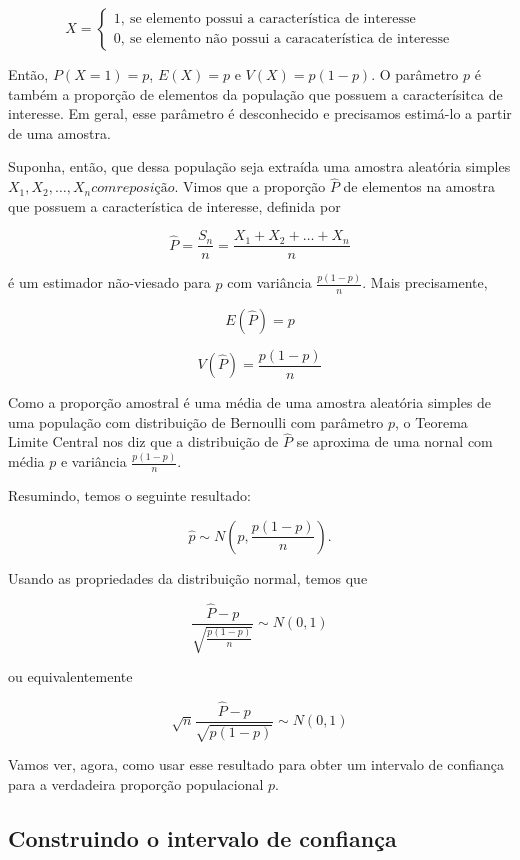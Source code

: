 \documentclass[
]{book}
\begin{document}
\[
X=\begin{cases}
1,~\text{se elemento possui a característica de interesse}\\
0,~\text{se elemento não possui a caracaterística de interesse}
\end{cases}
\]

Então, \(P(X = 1) = p\), \(E(X) = p\) e \(V(X) = p(1 - p)\). O parâmetro \(p\) é também a proporção de elementos da população que possuem a caracterísitca de interesse. Em geral, esse parâmetro é desconhecido e precisamos estimá-lo a partir de uma amostra.

Suponha, então, que dessa população seja extraída uma amostra aleatória simples \(X_1, X_2, \ldots, X_n com reposição\). Vimos que a proporção \(\hat P\) de elementos na amostra que possuem a característica de interesse, definida por

\[\hat P = \frac{S_n}{n}=\frac{X_1+X_2+\ldots+X_n}{n}\]

é um estimador não-viesado para \(p\) com variância \(\frac{p(1-p)}{n}\). Mais precisamente,

\[E(\hat P)=p\]

\[V(\hat P)=\frac{p(1-p)}{n}\]

Como a proporção amostral é uma média de uma amostra aleatória simples de uma população com distribuição de Bernoulli com parâmetro \(p\), o Teorema Limite Central nos diz que a distribuição de \(\hat P\) se aproxima de uma nornal com média \(p\) e variância \(\frac{p(1-p)}{n}\).

Resumindo, temos o seguinte resultado:

\[\hat p \sim N\left(p,\frac{p(1-p)}{n}\right).\]

Usando as propriedades da distribuição normal, temos que

\[\frac{\hat P - p}{\sqrt{\frac{p(1-p)}{n}}}\sim N(0,1)\]

ou equivalentemente

\[\sqrt{n}\frac{\hat P - p}{\sqrt{p(1-p)}}\sim N(0,1)\]

Vamos ver, agora, como usar esse resultado para obter um intervalo de confiança para a verdadeira proporção populacional \(p\).

\hypertarget{construindo-o-intervalo-de-confianuxe7a-2}{%
\subsection{Construindo o intervalo de confiança}\label{construindo-o-intervalo-de-confianuxe7a-2}}
\end{document}
